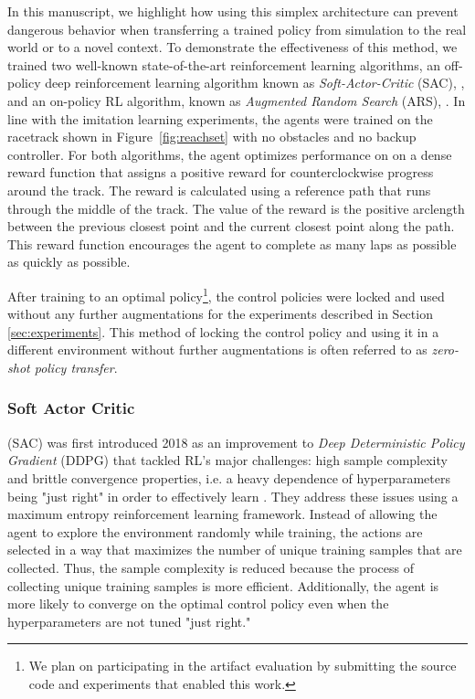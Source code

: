 \documentclass[manuscript,screen,review]{acmart}
\begin{document}
In this manuscript, we highlight how using this simplex architecture can prevent dangerous behavior when transferring a trained policy from simulation to the real world or to a novel context.
To demonstrate the effectiveness of this method, we trained  two well-known state-of-the-art reinforcement learning algorithms, an off-policy deep reinforcement learning algorithm known as \emph{Soft-Actor-Critic} (SAC), \cite{haarnoja2018soft}, and an on-policy RL algorithm, known as \emph{Augmented Random Search} (ARS), \cite{mania2018simple}. %
In line with the imitation learning experiments, the agents were trained on the racetrack shown in Figure~\ref{fig:reachset} with no obstacles and no backup controller. For both algorithms, the agent optimizes performance on on a dense reward function that assigns a positive reward for counterclockwise progress around the track. The reward is calculated using a reference path that runs through the middle of the track. The value of the reward is the positive arclength between the previous closest point and the current closest point along the path. This reward function encourages the agent to complete as many laps as possible as quickly as possible.

After training to an optimal policy\footnote{We plan on participating in the artifact evaluation by submitting the source code and experiments that enabled this work.}, the control policies were locked and used without any further augmentations for the experiments described in Section \ref{sec:experiments}. This method of locking the control policy and using it in a different environment without further augmentations is often referred to as \emph{zero-shot policy transfer}.


\subsubsection{Soft Actor Critic}
(SAC) was first introduced 2018 as an improvement to \emph{Deep Deterministic Policy Gradient} (DDPG) that tackled RL's major challenges: high sample complexity and brittle convergence properties, i.e. a heavy dependence of hyperparameters being "just right" in order to effectively learn \cite{haarnoja2018soft}. They address these issues using a maximum entropy reinforcement learning framework. Instead of allowing the agent to explore the environment randomly while training, the actions are selected in a way that maximizes the number of unique training samples that are collected. Thus, the sample complexity is reduced because the process of collecting unique training samples is more efficient. Additionally, the agent is more likely to converge on the optimal control policy even when the hyperparameters are not tuned "just right."
\end{document}
